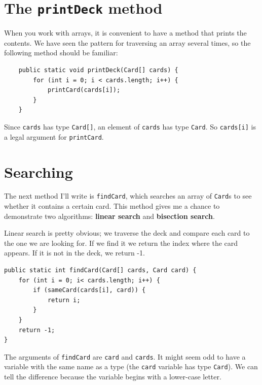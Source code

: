 \documentclass[12pt]{book}
\theoremstyle{exercise}
\begin{document}
\section{The {\tt printDeck} method}
\label{printdeck}

When you work with arrays, it is convenient to have
a method that prints the contents.  We have
seen the pattern for traversing an array several times, so the
following method should be familiar:

\begin{lstlisting}
    public static void printDeck(Card[] cards) {
        for (int i = 0; i < cards.length; i++) {
            printCard(cards[i]);
        }
    }
\end{lstlisting}

Since {\tt cards} has type {\tt Card[]}, an element of {\tt cards}
has type {\tt Card}.  So {\tt cards[i]} is a legal argument
for {\tt printCard}.


\section{Searching}
\label{findcard}

The next method I'll write is {\tt findCard}, which searches
an array of {\tt Card}s to see whether it contains a certain
card.  This method
gives me a chance to demonstrate two algorithms:
{\bf linear search} and {\bf bisection search}.

Linear search is pretty obvious; we traverse
the deck and compare each card to the one we are looking for.  If we
find it we return the index where the card appears.  If it is not in
the deck, we return -1.

\begin{lstlisting}
public static int findCard(Card[] cards, Card card) {
    for (int i = 0; i< cards.length; i++) {
        if (sameCard(cards[i], card)) {
            return i;
        }
    }
    return -1;
}
\end{lstlisting}
%
The arguments of {\tt findCard} are {\tt card} and {\tt cards}.
It might seem odd to have a variable with the same name as a type (the
{\tt card} variable has type {\tt Card}).  We can tell the difference
because the variable begins with a lower-case letter.

\end{document}
